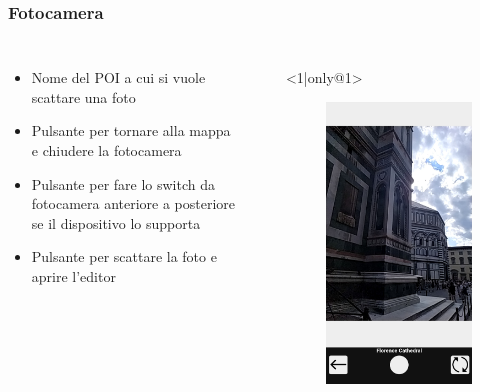 \documentclass{beamer}
\begin{document}
\begin{frame}
\frametitle{Fotocamera}
\begin{columns}
\begin{itemize}
	\item <2-> Nome del POI a cui si vuole scattare una foto
 	\item <3-> Pulsante per tornare alla mappa e chiudere la fotocamera
 	\item <4-> Pulsante per fare lo switch da fotocamera anteriore a posteriore se il dispositivo lo supporta
 	\item <5-> Pulsante per scattare la foto e aprire l'editor
\end{itemize}


\begin{itemize}
	\item[] <1|only@1> 
		\begin{figure}[!h]
 			\centering
 			\includegraphics[scale=0.1]{"Immagini/open_camera.jpg"}

\end{figure}
\end{itemize}
\end{columns}
\end{frame}
\end{document}
